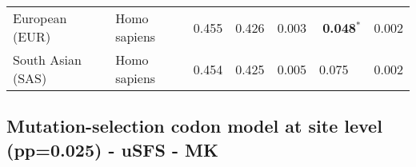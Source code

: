 \begin{center}
\begin{adjustbox}{width = 1\textwidth}
\begin{tabular}{|l|l|r|r|r|r|r|}
                 European (EUR) &         Homo sapiens &                                              0.455 &                                              0.426 &            0.003 &                  \textbf{0.048}$\bm{^*}$ &              0.002 \\
              South Asian (SAS) &         Homo sapiens &                                              0.454 &                                              0.425 &            0.005 &                         0.075~~ &              0.002 \\
\bottomrule
\end{tabular}
\end{adjustbox}
\newpage
\end{center}
\subsection{Mutation-selection codon model at site level (pp=0.025) - uSFS - MK}
